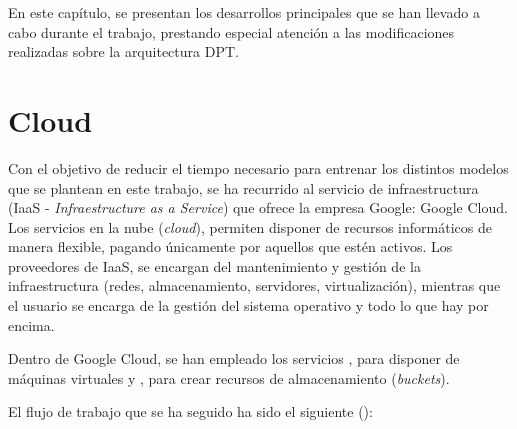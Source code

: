 
En este capítulo, se presentan los desarrollos principales que se han llevado a cabo durante el trabajo, prestando especial atención a las modificaciones realizadas sobre la arquitectura DPT.

\section{Cloud}\label{cloud}

Con el objetivo de reducir el tiempo necesario para entrenar los distintos modelos que se plantean en este trabajo, se ha recurrido al servicio de infraestructura (IaaS - \textit{Infraestructure as a Service}) que ofrece la empresa Google: Google Cloud. Los servicios en la nube (\textit{cloud}), permiten disponer de recursos informáticos de manera flexible, pagando únicamente por aquellos que estén activos. Los proveedores de IaaS, se encargan del mantenimiento y gestión de la infraestructura (redes, almacenamiento, servidores, virtualización), mientras que el usuario se encarga de la gestión del sistema operativo y todo lo que hay por encima. 

Dentro de Google Cloud, se han empleado los servicios , para disponer de máquinas virtuales y , para crear recursos de almacenamiento (\textit{buckets}).

El flujo de trabajo que se ha seguido ha sido el siguiente ():

